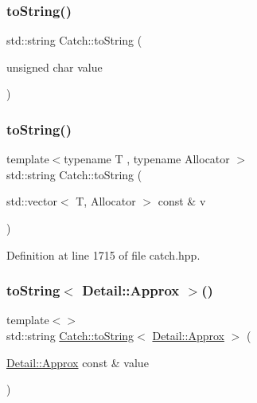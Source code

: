 \hypertarget{namespace_catch_a5d83eaeb68579a556c86cc05f7a7765f}{}\label{namespace_catch_a5d83eaeb68579a556c86cc05f7a7765f} 
\subsubsection{\texorpdfstring{to\+String()}{toString()}\hspace{0.1cm}{\footnotesize\ttfamily [16/17]}}
{\footnotesize\ttfamily std\+::string Catch\+::to\+String (\begin{DoxyParamCaption}\item[{unsigned char}]{value }\end{DoxyParamCaption})}

\hypertarget{namespace_catch_a2899237fef39daaae9a22e7846c0a9bf}{}\label{namespace_catch_a2899237fef39daaae9a22e7846c0a9bf} 
\subsubsection{\texorpdfstring{to\+String()}{toString()}\hspace{0.1cm}{\footnotesize\ttfamily [17/17]}}
{\footnotesize\ttfamily template$<$typename T , typename Allocator $>$ \\
std\+::string Catch\+::to\+String (\begin{DoxyParamCaption}\item[{std\+::vector$<$ T, Allocator $>$ const \&}]{v }\end{DoxyParamCaption})}



Definition at line 1715 of file catch.\+hpp.

\hypertarget{namespace_catch_ac501c2b6bfe82978d699ddda37c53d13}{}\label{namespace_catch_ac501c2b6bfe82978d699ddda37c53d13} 
\subsubsection{\texorpdfstring{to\+String$<$ Detail\+::\+Approx $>$()}{toString< Detail::Approx >()}}
{\footnotesize\ttfamily template$<$$>$ \\
std\+::string \hyperlink{namespace_catch_adbd1730f961da94d9ed284f70fd7a28b}{Catch\+::to\+String}$<$ \hyperlink{class_catch_1_1_detail_1_1_approx}{Detail\+::\+Approx} $>$ (\begin{DoxyParamCaption}\item[{\hyperlink{class_catch_1_1_detail_1_1_approx}{Detail\+::\+Approx} const \&}]{value }\end{DoxyParamCaption})\hspace{0.3cm}{\ttfamily [inline]}}



